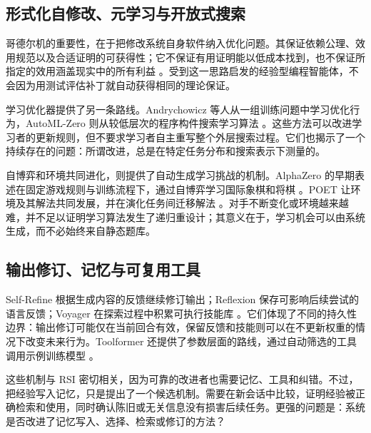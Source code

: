\documentclass[11pt,,]{article}
\begin{document}
\hypertarget{ux5f62ux5f0fux5316ux81eaux4feeux6539ux5143ux5b66ux4e60ux4e0eux5f00ux653eux5f0fux641cux7d22}{%
\subsection{形式化自修改、元学习与开放式搜索}\label{ux5f62ux5f0fux5316ux81eaux4feeux6539ux5143ux5b66ux4e60ux4e0eux5f00ux653eux5f0fux641cux7d22}}

哥德尔机的重要性，在于把修改系统自身软件纳入优化问题。其保证依赖公理、效用规范以及合适证明的可获得性；它不保证有用证明能以低成本找到，也不保证所指定的效用涵盖现实中的所有利益
\citep{goedel2003}。受到这一思路启发的经验型编程智能体，不会因为用测试评估补丁就自动获得相同的理论保证。

学习优化器提供了另一条路线。Andrychowicz
等人从一组训练问题中学习优化行为，AutoML-Zero
则从较低层次的程序构件搜索学习算法
\citep{learnoptimizer2016, automlzero2020}。这些方法可以改进学习者的更新规则，但不要求学习者自主重写整个外层搜索过程。它们也揭示了一个持续存在的问题：所谓改进，总是在特定任务分布和搜索表示下测量的。

自博弈和环境共同进化，则提供了自动生成学习挑战的机制。AlphaZero
的早期表述在固定游戏规则与训练流程下，通过自博弈学习国际象棋和将棋
\citep{alphazero2017}。POET
让环境及其解法共同发展，并在演化任务间迁移解法
\citep{poet2019}。对手不断变化或环境越来越难，并不足以证明学习算法发生了递归重设计；其意义在于，学习机会可以由系统生成，而不必始终来自静态题库。

\hypertarget{ux8f93ux51faux4feeux8ba2ux8bb0ux5fc6ux4e0eux53efux590dux7528ux5de5ux5177}{%
\subsection{输出修订、记忆与可复用工具}\label{ux8f93ux51faux4feeux8ba2ux8bb0ux5fc6ux4e0eux53efux590dux7528ux5de5ux5177}}

Self-Refine 根据生成内容的反馈继续修订输出；Reflexion
保存可影响后续尝试的语言反馈；Voyager 在探索过程中积累可执行技能库
\citep{selfrefine2023, reflexion2023, voyager2023}。它们体现了不同的持久性边界：输出修订可能仅在当前回合有效，保留反馈和技能则可以在不更新权重的情况下改变未来行为。Toolformer
还提供了参数层面的路线，通过自动筛选的工具调用示例训练模型
\citep{toolformer2023}。

这些机制与 RSI
密切相关，因为可靠的改进者也需要记忆、工具和纠错。不过，把经验写入记忆，只是提出了一个候选机制。需要在新会话中比较，证明经验被正确检索和使用，同时确认陈旧或无关信息没有损害后续任务。更强的问题是：系统是否改进了记忆写入、选择、检索或修订的方法？
\end{document}
